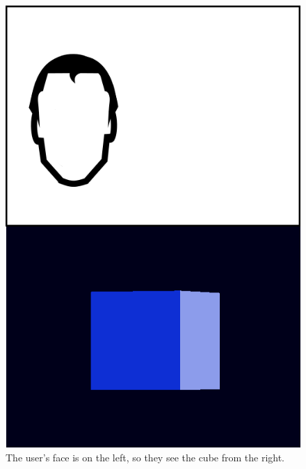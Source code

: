 \begin{figure}
  \centering
  \includegraphics[scale=0.3]{images/head-left}
  \caption{The user's face is on the left, so they see the cube from
    the right.}
  \label{fig:faceleft}
\end{figure}

